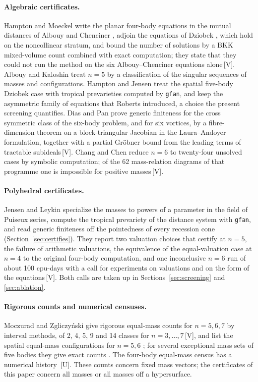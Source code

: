 \documentclass[11pt]{article}
\theoremstyle{definition}
\theoremstyle{remark}
\newcommand{\mk}[1]{\,{\scriptsize[#1]}}
\newcommand{\Vm}{\mk{V}}
\newcommand{\Um}{\mk{U}}
\begin{document}
\paragraph{Algebraic certificates.}
Hampton and Moeckel \cite{HM06} write the planar four-body equations in the mutual distances of Albouy and Chenciner
\cite{AC98}, adjoin the equations of Dziobek \cite{Dziobek00}, which hold on the noncollinear stratum, and bound the number of
solutions by a BKK mixed-volume count combined with exact computation; they state that they could not run the method on the six
Albouy--Chenciner equations alone\Vm. Albouy and Kaloshin \cite{AK12} treat $n=5$ by a classification of the singular
sequences of masses and configurations. Hampton and Jensen \cite{HJ11} treat the spatial five-body Dziobek case with tropical
prevarieties computed by \texttt{gfan}, and keep the asymmetric family of equations that Roberts introduced, a choice the
present screening quantifies. Dias and Pan \cite{DP18} prove generic finiteness for the cross symmetric class of the
six-body problem, and for six vortices, by a fibre-dimension theorem on a block-triangular Jacobian in the Laura--Andoyer
formulation, together with a partial Gr\"obner bound from the leading terms of tractable subideals\Vm. Chang and Chen \cite{ChangChen23}
reduce $n=6$ to twenty-four unsolved cases by symbolic computation; of the 62 mass-relation diagrams of that programme one is
impossible for positive masses\Vm.

\paragraph{Polyhedral certificates.}
Jensen and Leykin \cite{JL25} specialize the masses to powers of a parameter in the field of Puiseux series, compute the tropical
prevariety of the distance system with \texttt{gfan}, and read generic finiteness off the pointedness of every recession cone
(Section~\ref{sec:certifies}). They report two valuation choices that certify at $n=5$, the failure of arithmetic valuations, the
equivalence of the equal-valuation case at $n=4$ to the original four-body computation, and one inconclusive $n=6$ run of about
100 cpu-days with a call for experiments on valuations and on the form of the equations\Vm. Both calls are taken up in
Sections~\ref{sec:screening} and \ref{sec:ablation}.

\paragraph{Rigorous counts and numerical censuses.}
Moczurad and Zgliczy\'nski \cite{MZ19} give rigorous equal-mass counts for $n=5,6,7$ by interval methods, of 2, 4, 5, 9 and 14
classes for $n=3,\dots,7$\Vm, and list the spatial equal-mass configurations for $n=5,6$ \cite{MZ20}; for several exceptional
mass sets of five bodies they give exact counts \cite{MZ26}. The four-body equal-mass census has a numerical history
\cite{Simo78,Albouy96}\Um. These counts concern fixed mass vectors; the certificates of this paper concern all masses or all masses
off a hypersurface.
\end{document}
